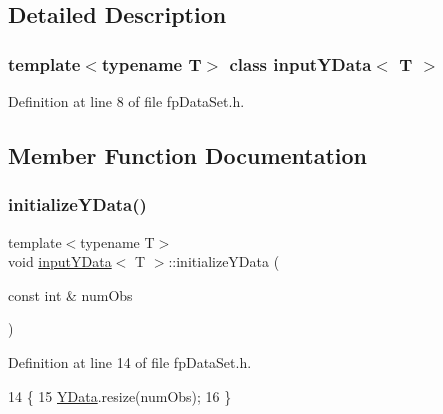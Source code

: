 \subsection{Detailed Description}
\subsubsection*{template$<$typename T$>$\newline
class input\+Y\+Data$<$ T $>$}



Definition at line 8 of file fp\+Data\+Set.\+h.



\subsection{Member Function Documentation}
\mbox{\label{classinputYData_abe1f8827e0bc89cec0c218ed5cfeea72}} 
\subsubsection{\texorpdfstring{initialize\+Y\+Data()}{initializeYData()}}
{\footnotesize\ttfamily template$<$typename T$>$ \\
void \hyperlink{classinputYData}{input\+Y\+Data}$<$ T $>$\+::initialize\+Y\+Data (\begin{DoxyParamCaption}\item[{const int \&}]{num\+Obs }\end{DoxyParamCaption})\hspace{0.3cm}{\ttfamily [inline]}}



Definition at line 14 of file fp\+Data\+Set.\+h.


\begin{DoxyCode}
14                                                \{
15             \hyperlink{classinputYData_a0b1d0b2e92ec4351f8a098a365fd9746}{YData}.resize(numObs);
16         \}
\end{DoxyCode}
\mbox{\label{classinputYData_a93becb50dcb3b2d6dd3c488ae83b2c6b}} 
